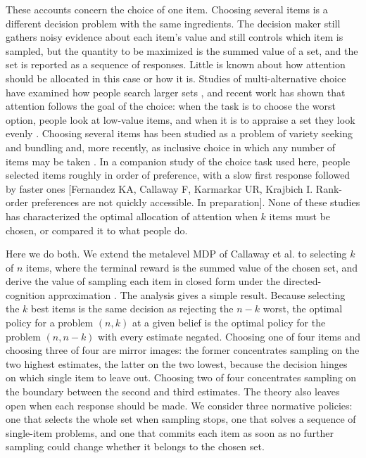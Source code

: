 \documentclass[10pt,letterpaper]{article}
\begin{document}
These accounts concern the choice of one item. Choosing several items is
a different decision problem with the same ingredients. The decision
maker still gathers noisy evidence about each item's value and still
controls which item is sampled, but the quantity to be maximized is the
summed value of a set, and the set is reported as a sequence of
responses. Little is known about how attention should be allocated in
this case or how it is. Studies of multi-alternative choice have
examined how people search larger sets
\cite{reutskaja2011,russo1994,gluth2018,gluth2020}, and recent work has
shown that attention follows the goal of the choice: when the task is to
choose the worst option, people look at low-value items, and when it is
to appraise a set they look evenly
\cite{fromer2026,fromer2019,sepulveda2020,kovach2014}. Choosing several
items has been studied as a problem of variety seeking and bundling
\cite{simonson1990,read1995} and, more recently, as inclusive choice in
which any number of items may be taken \cite{leng2025}. In a companion
study of the choice task used here, people selected items roughly in
order of preference, with a slow first response followed by faster ones
{[}Fernandez KA, Callaway F, Karmarkar UR, Krajbich I. Rank-order
preferences are not quickly accessible. In preparation{]}. None of these
studies has characterized the optimal allocation of attention when \(k\)
items must be chosen, or compared it to what people do.

Here we do both. We extend the metalevel MDP of Callaway et al.
\cite{callaway2021} to selecting \(k\) of \(n\) items, where the
terminal reward is the summed value of the chosen set, and derive the
value of sampling each item in closed form under the directed-cognition
approximation \cite{gabaix2005,gabaix2006}. The analysis gives a simple
result. Because selecting the \(k\) best items is the same decision as
rejecting the \(n-k\) worst, the optimal policy for a problem \((n, k)\)
at a given belief is the optimal policy for the problem \((n, n-k)\)
with every estimate negated. Choosing one of four items and choosing
three of four are mirror images: the former concentrates sampling on the
two highest estimates, the latter on the two lowest, because the
decision hinges on which single item to leave out. Choosing two of four
concentrates sampling on the boundary between the second and third
estimates. The theory also leaves open when each response should be
made. We consider three normative policies: one that selects the whole
set when sampling stops, one that solves a sequence of single-item
problems, and one that commits each item as soon as no further sampling
could change whether it belongs to the chosen set.
\end{document}
